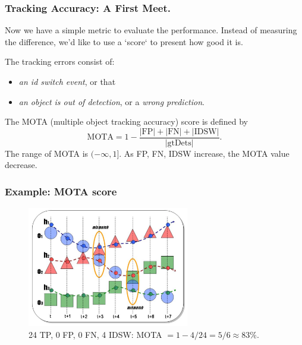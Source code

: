 \documentclass[slidetop, mathserif]{beamer}
\begin{document}
\begin{frame}
	\frametitle{Tracking Accuracy: A First Meet.}

	Now %
	we have a simple metric to evaluate the performance.
	Instead of measuring the difference,
	we'd like to use a `score` to present how good it is.

	\vspace{3pt}

	The tracking errors consist of:
	\begin{itemize}
	\item \emph{an id switch event}, or that
	\item \emph{an object is out of detection}, or a \emph{wrong prediction}.
	\end{itemize}

	The MOTA (multiple object tracking accuracy) score is defined by
	\[
		\text{MOTA} = 1 - \dfrac{|\text{FP}| + |\text{FN}| + |\text{IDSW}|}{|\text{gtDets}|}.
	\]
	The range of MOTA is $(-\infty,1]$. As FP, FN, IDSW increase, the MOTA value decrease.

\end{frame}

\begin{frame}
	\frametitle{Example: MOTA score}

	\begin{figure}
		\includegraphics[width=200pt]{pics/fig16.png}
		\caption{24 TP, 0 FP, 0 FN, 4 IDSW: MOTA $=1-4/24 = 5/6 \approx 83\%$.}
	\end{figure}
\end{frame}
\end{document}
